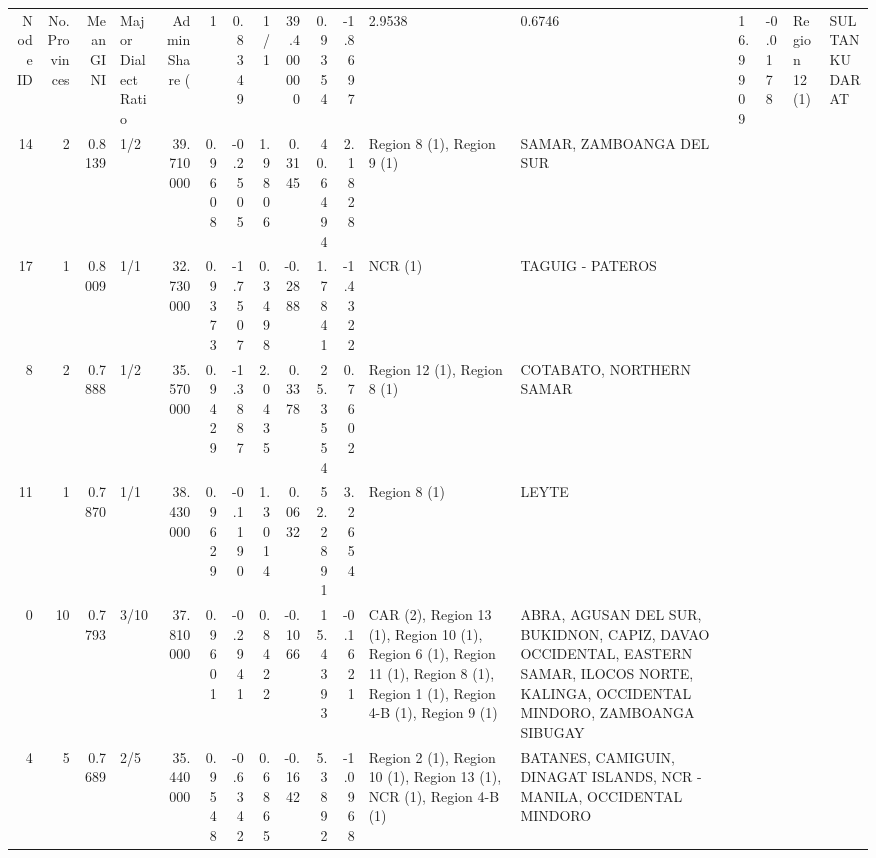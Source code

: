 \begin{tabular}{rrrlrrrrrrrll}
\toprule
Node ID & No. Provinces & Mean GINI & Major Dialect Ratio & Admin Share (%
 & 1 & {} \color[HTML]{F1F1F1} 0.8349 & 1/1 & {} \color[HTML]{000000} 39.400000 & 0.9354 & -1.8697 & 2.9538 & 0.6746 & 16.9909 & -0.0178 & Region 12 (1) & SULTAN KUDARAT \\
14 & 2 & {} \color[HTML]{F1F1F1} 0.8139 & 1/2 & {} \color[HTML]{000000} 39.710000 & 0.9608 & -0.2505 & 1.9806 & 0.3145 & 40.6494 & 2.1828 & Region 8 (1), Region 9 (1) & SAMAR, ZAMBOANGA DEL SUR \\
17 & 1 & {} \color[HTML]{000000} 0.8009 & 1/1 & {} \color[HTML]{F1F1F1} 32.730000 & 0.9373 & -1.7507 & 0.3498 & -0.2888 & 1.7841 & -1.4322 & NCR (1) & TAGUIG - PATEROS \\
8 & 2 & {} \color[HTML]{000000} 0.7888 & 1/2 & {} \color[HTML]{F1F1F1} 35.570000 & 0.9429 & -1.3887 & 2.0435 & 0.3378 & 25.3554 & 0.7602 & Region 12 (1), Region 8 (1) & COTABATO, NORTHERN SAMAR \\
11 & 1 & {} \color[HTML]{000000} 0.7870 & 1/1 & {} \color[HTML]{000000} 38.430000 & 0.9629 & -0.1190 & 1.3014 & 0.0632 & 52.2891 & 3.2654 & Region 8 (1) & LEYTE \\
0 & 10 & {} \color[HTML]{000000} 0.7793 & 3/10 & {} \color[HTML]{000000} 37.810000 & 0.9601 & -0.2941 & 0.8422 & -0.1066 & 15.4393 & -0.1621 & CAR (2), Region 13 (1), Region 10 (1), Region 6 (1), Region 11 (1), Region 8 (1), Region 1 (1), Region 4-B (1), Region 9 (1) & ABRA, AGUSAN DEL SUR, BUKIDNON, CAPIZ, DAVAO OCCIDENTAL, EASTERN SAMAR, ILOCOS NORTE, KALINGA, OCCIDENTAL MINDORO, ZAMBOANGA SIBUGAY \\
4 & 5 & {} \color[HTML]{000000} 0.7689 & 2/5 & {} \color[HTML]{F1F1F1} 35.440000 & 0.9548 & -0.6342 & 0.6865 & -0.1642 & 5.3892 & -1.0968 & Region 2 (1), Region 10 (1), Region 13 (1), NCR (1), Region 4-B (1) & BATANES, CAMIGUIN, DINAGAT ISLANDS, NCR - MANILA, OCCIDENTAL MINDORO \\

\end{tabular}
